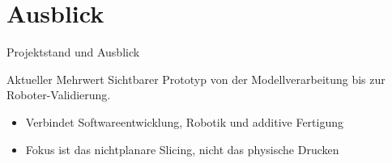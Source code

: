 \documentclass[aspectratio=169,11pt]{beamer}
\begin{document}
\section{Ausblick}
\begin{frame}{Projektstand und Ausblick}
  \begin{block}{Aktueller Mehrwert}
    Sichtbarer Prototyp von der Modellverarbeitung bis zur Roboter-Validierung.
  \end{block}

  \begin{itemize}
    \item Verbindet Softwareentwicklung, Robotik und additive Fertigung
    \item Fokus ist das nichtplanare Slicing, nicht das physische Drucken
  \end{itemize}
\end{frame}
\end{document}
